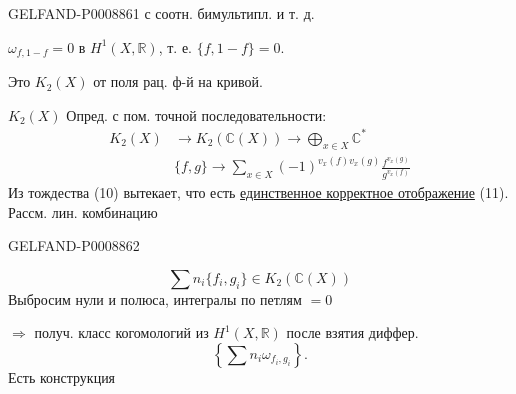 \begin{GelfandAdjacentEvidence}{GELFAND-P000886}{1}
с соотн. бимультипл. и т. д.

$\omega_{f,1-f}=0$ в $H^1(X,\mathbb R)$, т. е. $\{f,1-f\}=0$.

Это $K_2(X)$ от поля рац. ф-й на кривой.

$K_2(X)$ Опред. с пом. точной последовательности:
\begin{equation*}
\begin{aligned}
K_2(X)&\to K_2(\mathbb C(X))\to\bigoplus_{x\in X}\mathbb C^*\\
&\{f,g\}\longrightarrow\sum_{x\in X}(-1)^{v_x(f)v_x(g)}\frac{f^{v_x(g)}}{g^{v_x(f)}}
\end{aligned}
\tag{12}
\end{equation*}
Из тождества (10) вытекает, что есть \uline{единственное корректное отображение} (11). Рассм. лин. комбинацию

\end{GelfandAdjacentEvidence}
\begin{GelfandAdjacentEvidence}{GELFAND-P000886}{2}

\begin{equation*}
\sum n_i\{f_i,g_i\}\in K_2(\mathbb C(X))
\tag{13}
\end{equation*}
Выбросим нули и полюса, интегралы по петлям $=0$

$\Rightarrow$ получ. класс когомологий из $H^1(X,\mathbb R)$ после взятия диффер.
\begin{equation*}
\left\{\sum n_i\omega_{f_i,g_i}\right\}.
\tag{14}
\end{equation*}
Есть конструкция

\end{GelfandAdjacentEvidence}
